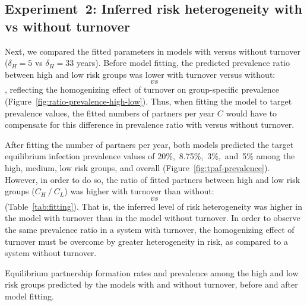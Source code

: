 \subsection{Experiment~2: Inferred risk heterogeneity with vs without turnover}
\label{ss:res-infer}
Next, we compared the fitted parameters in models with versus without turnover
($\delta_H = 5$ vs $\delta_H = 33$ years).
Before model fitting, the predicted prevalence ratio
between high and low risk groups was lower with turnover versus without:
$$~vs~%
$$,
reflecting the homogenizing effect of turnover on group-specific prevalence
(Figure~\ref{fig:ratio-prevalence-high-low}).
Thus, when fitting the model to target prevalence values,
the fitted numbers of partners per year $C$ would have to compensate for
this difference in prevalence ratio with versus without turnover.
\par
After fitting the number of partners per year, both models predicted
the target equilibrium infection prevalence values of 20\%,~8.75\%,~3\%,~and~5\%
among the high, medium, low risk groups, and overall
(Figure~\ref{fig:tpaf-prevalence}).
However, in order to do so, the ratio of fitted partners
between high and low risk groups ($C_H~/~C_L$)
was higher with turnover than without:
$$~vs~%
$$
(Table~\ref{tab:fitting}).
That is, the inferred level of risk heterogeneity was higher
in the model with turnover than in the model without turnover.
In order to observe the same prevalence ratio in a system with turnover,
the homogenizing effect of turnover must be overcome by
greater heterogeneity in risk, as compared to a system without turnover.
\begin{table}
  \centering
  \caption{Equilibrium partnership formation rates and prevalence
    among the high and low risk groups
    predicted by the models with and without turnover,
    before and after model fitting.}
  \label{tab:fitting}
  
\end{table}
